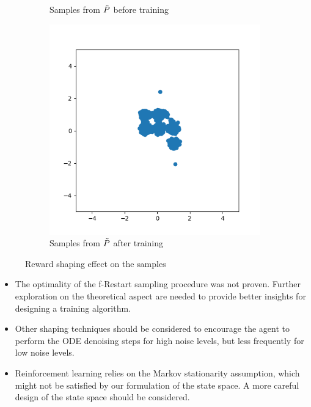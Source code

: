 \begin{figure}[htbp]
\begin{subfigure}{0.32\textwidth}
        \caption{Samples from $\Tilde{P}$ before training}
        \label{fig:pre_trained}
    \end{subfigure}
    \hfill 
    \begin{subfigure}{0.32\textwidth}
        \includegraphics[width=\linewidth]{gfx/exponential_False_plots_rl_train_50.png}
        \caption{Samples from $\Tilde{P}$ after training}
        \label{fig:shaping}
    \end{subfigure}

    \caption{Reward shaping effect on the samples}
    \label{fig:shaping_effect}
\end{figure}
\begin{itemize}
    \item The optimality of the f-Restart sampling procedure was not proven. Further exploration on the theoretical aspect are needed to provide better insights for designing a training algorithm.
    \item Other shaping techniques should be considered to encourage the agent to perform the ODE denoising steps for high noise levels, but less frequently for low noise levels.
    \item Reinforcement learning relies on the Markov stationarity assumption, which might not be satisfied by our formulation of the state space. A more careful design of the state space should be considered.
\end{itemize}

